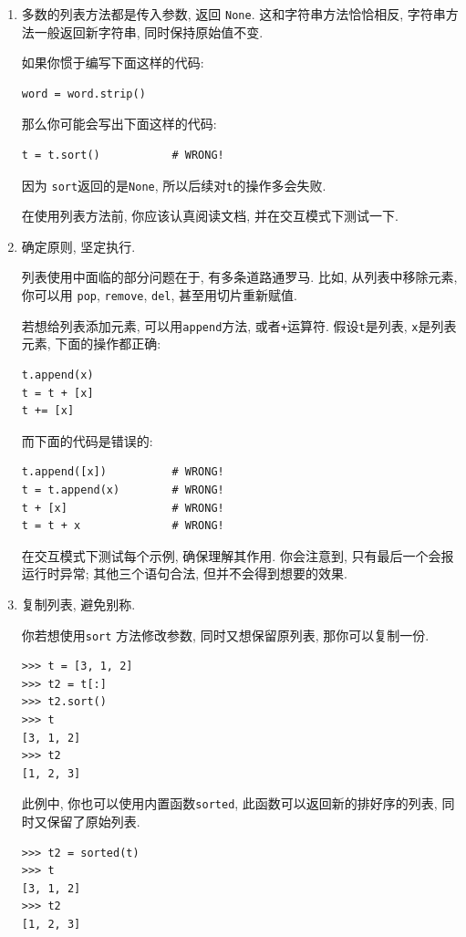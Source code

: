 \documentclass[10pt]{book}
\begin{document}
\begin{enumerate}

\item 多数的列表方法都是传入参数, 返回 {\tt None}. 
这和字符串方法恰恰相反, 字符串方法一般返回新字符串, 
同时保持原始值不变. 

如果你惯于编写下面这样的代码:

\begin{verbatim}
word = word.strip()
\end{verbatim}

那么你可能会写出下面这样的代码:

\begin{verbatim}
t = t.sort()           # WRONG!
\end{verbatim}

因为 {\tt sort}返回的是{\tt None}, 所以后续对{\tt t}的操作多会失败.

在使用列表方法前, 你应该认真阅读文档, 并在交互模式下测试一下. 

\item 确定原则, 坚定执行.

列表使用中面临的部分问题在于, 有多条道路通罗马. 
比如, 从列表中移除元素, 你可以用 {\tt pop}, {\tt remove}, {\tt del},
甚至用切片重新赋值. 

若想给列表添加元素, 可以用{\tt append}方法, 或者{\tt +}运算符. 
假设{\tt t}是列表, {\tt x}是列表元素, 下面的操作都正确: 

\begin{verbatim}
t.append(x)
t = t + [x]
t += [x]
\end{verbatim}

而下面的代码是错误的:

\begin{verbatim}
t.append([x])          # WRONG!
t = t.append(x)        # WRONG!
t + [x]                # WRONG!
t = t + x              # WRONG!
\end{verbatim}

在交互模式下测试每个示例, 确保理解其作用. 
你会注意到, 只有最后一个会报运行时异常;
其他三个语句合法, 但并不会得到想要的效果. 


\item 复制列表, 避免别称.

你若想使用{\tt sort} 方法修改参数, 同时又想保留原列表, 那你可以复制一份. 

\begin{verbatim}
>>> t = [3, 1, 2]
>>> t2 = t[:]
>>> t2.sort()
>>> t
[3, 1, 2]
>>> t2
[1, 2, 3]
\end{verbatim}

此例中, 你也可以使用内置函数{\tt sorted}, 
此函数可以返回新的排好序的列表, 同时又保留了原始列表. 

\begin{verbatim}
>>> t2 = sorted(t)
>>> t
[3, 1, 2]
>>> t2
[1, 2, 3]
\end{verbatim}

\end{enumerate}
\end{document}
